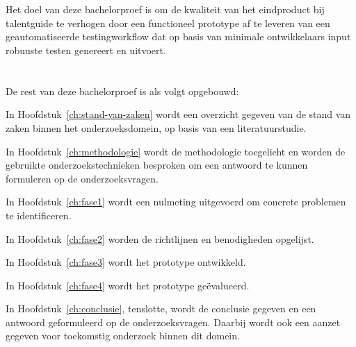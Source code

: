\section{}%
\label{sec:onderzoeksdoelstelling}


Het doel van deze bachelorproef is om de kwaliteit van het eindproduct bij talentguide te verhogen door een functioneel prototype af te leveren van een geautomatiseerde testingworkflow dat op basis van minimale ontwikkelaars input robuuste testen genereert en uitvoert.


\section{}%
\label{sec:opzet-bachelorproef}


De rest van deze bachelorproef is als volgt opgebouwd:

In Hoofdstuk~\ref{ch:stand-van-zaken} wordt een overzicht gegeven van de stand van zaken binnen het onderzoeksdomein, op basis van een literatuurstudie.

In Hoofdstuk~\ref{ch:methodologie} wordt de methodologie toegelicht en worden de gebruikte onderzoekstechnieken besproken om een antwoord te kunnen formuleren op de onderzoeksvragen.

In Hoofdstuk~\ref{ch:fase1} wordt een nulmeting uitgevoerd om concrete problemen te identificeren.

In Hoofdstuk~\ref{ch:fase2} worden de richtlijnen en benodigheden opgelijst.

In Hoofdstuk~\ref{ch:fase3} wordt het prototype ontwikkeld.

In Hoofdstuk~\ref{ch:fase4} wordt het prototype geëvalueerd.


In Hoofdstuk~\ref{ch:conclusie}, tenslotte, wordt de conclusie gegeven en een antwoord geformuleerd op de onderzoeksvragen. Daarbij wordt ook een aanzet gegeven voor toekomstig onderzoek binnen dit domein.